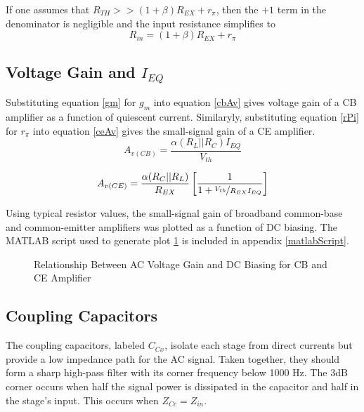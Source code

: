 \documentclass[titlepage, letterpaper, 11pt]{article}
\begin{document}
If one assumes that $R_{TH}>>(1+\beta)R_{EX}+r_{\pi}$, then the
$+1$ term in the denominator is negligible and the input resistance
simplifies to
\begin{equation}
R_{in}=(1+\beta)R_{EX}+r_{\pi}
\end{equation}

\subsection{Voltage Gain and $I_{EQ}$}
\label{gainVSquiescentCurrent}

Substituting equation \ref{gm} for $g_{m}$ into equation \ref{cbAv}
gives voltage gain of a CB amplifier as a function of quiescent
current. Similaryly, substituting equation \ref{rPi} for $r_{\pi}$
into equation \ref{ceAv} gives the small-signal gain of a CE
amplifier.
\begin{equation}
A_{v(CB)}=\frac{\alpha(R_{L}||R_{C})I_{EQ}}{V_{th}}
\end{equation}

\begin{equation}
A_{v(CE)}=\frac{\alpha(R_{C}||R_{L})}{R_{EX}}
\left[\frac{1}{1+\nicefrac{V_{th}}{R_{EX}I_{EQ}}}\right]
\end{equation}

Using typical resistor values, the small-signal gain of broadband
common-base and common-emitter amplifiers was plotted as a function
of DC biasing. The MATLAB script used to generate plot
\ref{gainQptRelation} is included in appendix \ref{matlabScript}.

\begin{figure}[ht]
	\centering

	\caption{
		Relationship Between AC Voltage Gain and DC Biasing
		for CB and CE Amplifier
	}
	\label{gainQptRelation}
\end{figure}


\subsection{Coupling Capacitors}

The coupling capacitors, labeled $C_{Cx}$, isolate each stage from
direct currents but provide a low impedance path for the AC signal.
Taken together, they should form a sharp high-pass filter with its
corner frequency below 1000 Hz. The 3dB corner occurs when half the
signal power is dissipated in the capacitor and half in the stage's
input. This occurs when $Z_{Cc}=Z_{in}$.
\end{document}

